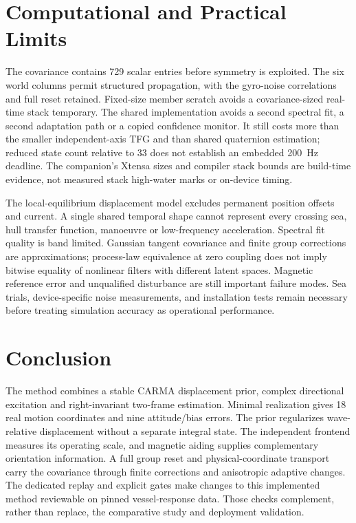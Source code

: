 \documentclass[conference]{IEEEtran}
\begin{document}
\section{Computational and Practical Limits}
The covariance contains 729 scalar entries before symmetry is exploited.
The six world columns permit structured propagation, with the gyro-noise
correlations and full reset retained. Fixed-size member scratch avoids a
covariance-sized real-time stack temporary. The shared implementation avoids
a second spectral fit, a second adaptation path or a copied confidence monitor.
It still costs more than the smaller independent-axis TFG and than shared
quaternion estimation; reduced state count relative to 33 does not establish
an embedded 200~Hz deadline. The companion's Xtensa sizes and compiler stack
bounds are build-time evidence, not measured stack high-water marks or
on-device timing.

The local-equilibrium displacement model excludes permanent position offsets
and current. A single shared temporal shape cannot represent every crossing
sea, hull transfer function, manoeuvre or low-frequency acceleration. Spectral
fit quality is band limited. Gaussian tangent covariance and finite group
corrections are approximations; process-law equivalence at zero coupling does
not imply bitwise equality of nonlinear filters with different latent spaces.
Magnetic reference error and unqualified disturbance are still important failure
modes. Sea trials, device-specific noise measurements, and installation tests
remain necessary before treating simulation accuracy as operational performance.

\section{Conclusion}
The method combines a stable CARMA displacement prior, complex directional
excitation and right-invariant two-frame estimation. Minimal realization gives
18 real motion coordinates and nine attitude/bias errors. The prior regularizes
wave-relative displacement without a separate integral state. The independent
frontend measures its operating scale, and magnetic aiding supplies complementary
orientation information. A full group reset and physical-coordinate transport
carry the covariance through finite corrections and anisotropic adaptive changes.
The dedicated replay and explicit gates make changes to this implemented method
reviewable on pinned vessel-response data. Those checks complement, rather than
replace, the comparative study and deployment validation.
\end{document}
